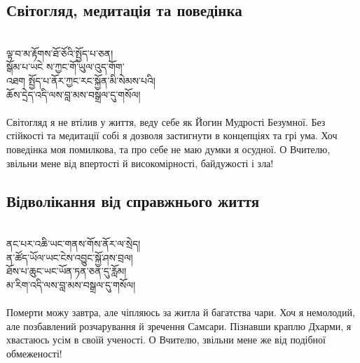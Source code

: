 \subsection*{Світогляд, медитація та поведінка}
\\
\ti
ལྟ་བ་མ་རྟོགས་ཐོ་ཅོའི་སྤྱོད་པ་ཅན།\\
སྒོམ་པ་ཡངེ ས་ཀྱང་གོ་ཡུལ་འུད་གོག་\\
འཐག སྤྱོད་པ་ནོར་ཀྱང་རང་སྐྱོན་མི་སེམས་པའི། \\
ཆོས་དྲེད་འདི་ལས་བླ་མས་བསྒྲལ་དུ་གསོལ།\\
\\
\ru
Світогляд я не втілив у життя, веду себе як Йогин Мудрості Безумної.
Без стійкості та медитації собі я дозволя застигнути в концепціях та грі ума.
Хоч поведінка моя помилкова, та про себе не маю думки я осудної.
О Вчителю, звільни мене від впертості й високомірності, байдужості і зла!\\

\newpage
\subsection*{Відволікання від справжнього життя}
\\
\ti
ནང་པར་འཆི་ཡང་གནས་གོས་ནོར་ལ་སྲེད།\\
ན་ཚོད་ཡོལ་ཡང་ངེས་འབྱུང་སྐྱོ་ཤས་བྲལ། \\
ཐོས་པ་ཆུང་ཡང་ཡོན་ཏན་ཅན་དུ་རློམ། \\
མ་རིག་འདི་ལས་བླ་མས་བསྒྲལ་དུ་གསོལ།\\
\\
\ru
Померти можу завтра, але чіпляюсь за житла й багатства чари.
Хоч я немолодий, але позбавлений розчарування й зречення Самсари.
Пізнавши краплю Дхарми, я хвастаюсь усім в своїй ученості.
О Вчителю, звільни мене же від подібної обмеженості!\\

